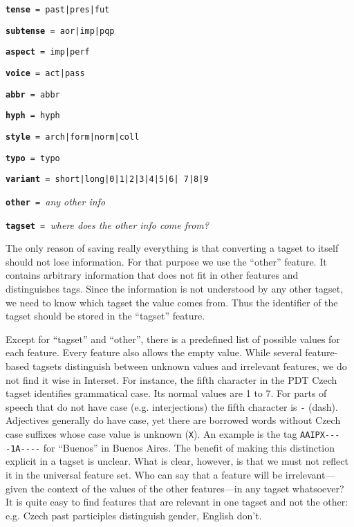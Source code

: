\documentclass[11pt]{article}
\newcommand{\XXX}{\textcolor{red}{XXX }} %
\begin{document}
\begin{compactitem}
\item \texttt{\textbf{tense} = past|pres|fut}
\item \texttt{\textbf{subtense} = aor|imp|pqp}
\item \texttt{\textbf{aspect} = imp|perf}
\item \texttt{\textbf{voice} = act|pass}
\item \texttt{\textbf{abbr} = abbr}
\item \texttt{\textbf{hyph} = hyph}
\item \texttt{\textbf{style} = arch|form|norm|coll}
\item \texttt{\textbf{typo} = typo}
\item \texttt{\textbf{variant} = short|long|0|1|2|3|4|5|6| 7|8|9}
\item \texttt{\textbf{other} = }\textit{any other info}
\item \texttt{\textbf{tagset} = }\textit{where does the other info come from?}
\end{compactitem}

The only reason of saving really everything is that converting a tagset to itself should not lose information. For that purpose we use the “other” feature. It contains arbitrary information that does not fit in other features and distinguishes tags. Since the information is not understood by any other tagset, we need to know which tagset the value comes from. Thus the identifier of the tagset should be stored in the “tagset” feature.

Except for “tagset” and “other”, there is a predefined list of possible values for each feature. Every feature also allows the empty value. While several feature-based tagsets distinguish between unknown values and irrelevant features, we do not find it wise in Interset. For instance, the fifth character in the PDT Czech tagset identifies grammatical case. Its normal values are 1 to 7. For parts of speech that do not have case (e.g. interjections) the fifth character is \texttt{-} (dash). Adjectives generally do have case, yet there are borrowed words without Czech case suffixes whose case value is unknown (\texttt{X}). An example is the tag \texttt{AAIPX-{}-{}-{}-1A-{}-{}-{}-} for “Buenos” in Buenos Aires. The benefit of making this distinction explicit in a tagset is unclear. What is clear, however, is that we must not reflect it in the universal feature set. Who can say that a feature will be irrelevant—given the context of the values of the other features—in any tagset whatsoever? It is quite easy to find features that are relevant in one tagset and not the other: e.g. Czech past participles distinguish gender, English don’t.
\end{document}
